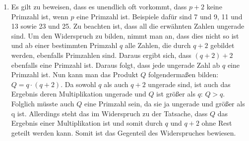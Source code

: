 \documentclass[a4paper]{article}
\begin{document}
\begin{enumerate}
		\item
		Es gilt zu beweisen, dass es unendlich oft vorkommt, dass $p + 2$ keine Primzahl ist, wenn $p$ eine Primzahl ist. Beispiele dafür sind 7 und 9, 11 und 13 sowie 23 und 25. Zu beachten ist, dass all die erwähnten Zahlen ungerade sind.
		\newline
		Um den Widerspruch zu bilden, nimmt man an, dass dies nicht so ist und ab einer bestimmten Primzahl $q$ alle Zahlen, die durch $q + 2$ gebildet werden, ebenfalls Primzahlen sind. Daraus ergibt sich, dass $(q + 2) + 2$ ebenfalls eine Primzahl ist. Daraus folgt, dass jede ungerade Zahl ab $q$ eine Primzahl ist.
		\newline
		Nun kann man das Produkt $Q$ folgendermaßen bilden: $Q = q \cdot (q + 2)$. Da sowohl $q$ als auch $q + 2$ ungerade sind, ist auch das Ergebnis deren Multiplikation ungerade und $Q$ ist größer als $q$: $Q > q$.
		\newline
		Folglich müsste auch $Q$ eine Primzahl sein, da sie ja ungerade und größer als q ist.
		Allerdings steht das im Widerspruch zu der Tatsache, dass $Q$ das Ergebnis einer Multiplikation ist und somit durch $q$ und $q + 2$ ohne Rest geteilt werden kann.
		\newline
		Somit ist das Gegenteil des Widerspruches bewiesen.
	\end{enumerate}
\end{document}
